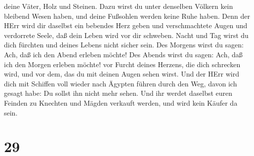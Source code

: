 deine Väter, Holz und Steinen.  Dazu wirst du unter
denselben Völkern kein bleibend Wesen haben, und deine Fußsohlen werden
keine Ruhe haben. Denn der HErr wird dir daselbst ein bebendes Herz
geben und verschmachtete Augen und verdorrete Seele,  daß
dein Leben wird vor dir schweben. Nacht und Tag wirst du dich fürchten
und deines Lebens nicht sicher sein.  Des Morgens wirst du
sagen: Ach, daß ich den Abend erleben möchte! Des Abends wirst du sagen:
Ach, daß ich den Morgen erleben möchte! vor Furcht deines Herzens, die
dich schrecken wird, und vor dem, das du mit deinen Augen sehen wirst.
 Und der HErr wird dich mit Schiffen voll wieder nach
Ägypten führen durch den Weg, davon ich gesagt habe: Du sollst ihn nicht
mehr sehen. Und ihr werdet daselbst euren Feinden zu Knechten und Mägden
verkauft werden, und wird kein Käufer da sein.

\hypertarget{section-28}{%
\section{29}\label{section-28}}

